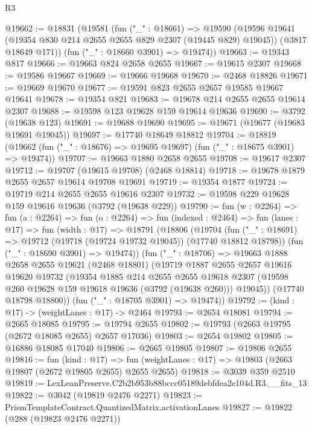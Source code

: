 \begin{lexlean}{R3}
\begin{coremodule}
@19662 := @18831
    (@19581
      (fun ("_" : @18661) =>
      @19590
        (@19596 @19641 (@19354 @830 @214 @2655 @2655 @829 @2307 (@19445 @829) @19045))
        (@3817 @18649 @171))
      (fun ("_" : @18660 @3901) => @19474))
@19663 := @19343 @817
@19666 := @19663 @824 @2658 @2655
@19667 := @19615 @2307
@19668 := @19586 @19667
@19669 := @19666 @19668
@19670 := @2468 @18826
@19671 := @19669 @19670
@19677 := @19591 @823 @2655 @2657 @19585 @19667 @19641
@19678 := @19354 @821
@19683 := @19678 @214 @2655 @2655 @19614 @2307
@19688 := @19598 @123 @19628 @159 @19614 @19636
@19690 := @3792 (@19638 @123)
@19691 := @19688 @19690
@19695 := @19671 (@19677 (@19683 @19691 @19045))
@19697 := @17740 @18649 @18812
@19704 := @18819 (@19662 (fun ("_" : @18676) => @19695 @19697) (fun ("_" : @18675 @3901) => @19474))
@19707 := @19663 @1880 @2658 @2655
@19708 := @19617 @2307
@19712 := @19707 (@19615 @19708) (@2468 @18814)
@19718 := @19678 @1879 @2655 @2657 @19614 @19708 @19691
@19719 := @19354 @1877
@19724 := @19719 @214 @2655 @2655 @19616 @2307
@19732 := @19598 @229 @19628 @159 @19616 @19636 (@3792 (@19638 @229))
@19790 := fun (w : @2264) =>
  fun (a : @2264) =>
  fun (o : @2264) =>
  fun (indexed : @2464) =>
  fun (lanes : @17) =>
  fun (width : @17) =>
  @18791
    (@18806
      (@19704
        (fun ("_" : @18691) => @19712 (@19718 (@19724 @19732 @19045)) (@17740 @18812 @18798))
        (fun ("_" : @18690 @3901) => @19474))
      (fun ("_" : @18706) =>
      @19663
        @1888
        @2658
        @2655
        @19621
        (@2468 @18801)
        (@19719
          @1887
          @2655
          @2657
          @19616
          @19620
          @19732
          (@19354
            @1885
            @214
            @2655
            @2655
            @19618
            @2307
            (@19598 @260 @19628 @159 @19618 @19636 (@3792 (@19638 @260)))
            @19045))
        (@17740 @18798 @18800))
      (fun ("_" : @18705 @3901) => @19474))
@19792 := (kind : @17) -> (weightLanes : @17) -> @2464
@19793 := @2654 @18081
@19794 := @2665 @18085
@19795 := @19794 @2655
@19802 := @19793 (@2663 @19795 (@2672 @18085 @2655) @2657 @17036)
@19803 := @2654 @19802
@19805 := @16886 @18085 @17040
@19806 := @2665 @19805
@19807 := @19806 @2655
@19816 := fun (kind : @17) =>
  fun (weightLanes : @17) => @19803 (@2663 @19807 (@2672 @19805 @2655) @2655 @2655)
@19818 := @3039 @359 @2510
@19819 := LexLeanPreserve.C2b2b953b88bccc05189debfdea2e104d.R3.__fits_13
@19822 := @3042 (@19819 @2476 @2271)
@19823 := PrismTemplateContract.QuantizedMatrix.activationLanes
@19827 := @19822 (@288 (@19823 @2476 @2271))

\end{coremodule}
\end{lexlean}
